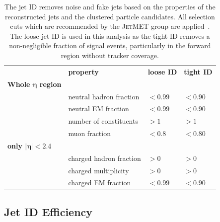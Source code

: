 \begin{table}[htbp]
    \centering
    \caption[Jet ID criteria]{The jet ID removes noise and fake jets based on
        the properties of the reconstructed jets and the clustered particle
        candidates. All selection cuts which are recommended by the
        \textsc{JetMET} group are applied~\cite{jetmet:jetid}. The loose jet ID is
        used in this analysis as the tight ID removes a non-negligible fraction
        of signal events, particularly in the forward region without tracker
        coverage.}
    \label{tab:jetid}
    \begin{tabular}{llll}
    \toprule
                                 & \textbf{property}       & \textbf{loose ID} & \textbf{tight ID}\\\cmidrule(lr){2-4}
                                 \textbf{Whole $\bm{\eta}$ region} &                         &                   & \\\cmidrule(lr){1-1}
                                 & neutral hadron fraction & $< 0.99$          & $< 0.90$\\
                                 & neutral EM fraction     & $< 0.99$          & $< 0.90$\\
                                 & number of constituents  & $> 1$             & $> 1$\\
                                 & muon fraction           & $< 0.8$           & $< 0.80$\\
                                 \textbf{only $\bm{|\eta| < 2.4}$} &                         &                   & \\\cmidrule(lr){1-1}
                                 & charged hadron fraction & $> 0$             & $> 0$\\
                                 & charged multiplicity    & $> 0$             & $> 0$\\
                                 & charged EM fraction     & $< 0.99$          & $< 0.90$\\
    \bottomrule
    \end{tabular}
\end{table}


\subsection{Jet ID Efficiency}

